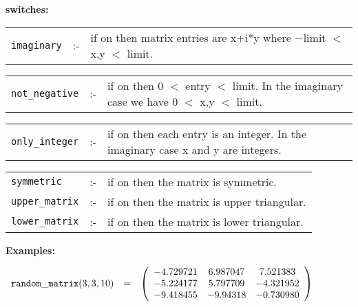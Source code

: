 {\bf switches:}

\hspace*{0.1in}
\begin{tabular}{l l l}
{\tt imaginary} \hspace*{0.175in} &:-& \parbox[t]{0.685\linewidth}{if
on then matrix entries are x+i$*$y where $-$limit $<$ x,y $<$ limit.}
\end{tabular}

\vspace*{0.04in}
\hspace*{0.1in}
\begin{tabular}{l l l}
{\tt not\_negative} &:-& \parbox[t]{0.685\linewidth}{if on then 0 $<$
entry $<$ limit. In the imaginary case we have 0 $<$ x,y $<$ limit.}
\end{tabular}

\vspace*{0.04in}
\hspace*{0.1in}
\begin{tabular}{l l l}
{\tt only\_integer} &:-& \parbox[t]{0.685\linewidth}{if on then each
entry is an integer. In the imaginary case x and y are integers.}
\end{tabular}

\vspace*{0.04in}
\hspace*{0.1in}
\begin{tabular}{l l l}
{\tt symmetric} &:-& if on then the matrix is symmetric. \\
{\tt upper\_matrix} &:-& \parbox[t]{0.685\linewidth}{if on then the
matrix is upper triangular.} \\
{\tt lower\_matrix} &:-& if on then the matrix is lower triangular.
\end{tabular}

{\bf Examples:}

\begin{flushleft}
\hspace*{0.1in}
\begin{math}
\begin{array}{ccc}
{\tt random\_matrix}(3,3,10) & = &
        \left( \begin{array}{ccc} -4.729721 & 6.987047 & 7.521383 \\
- 5.224177 & 5.797709 & - 4.321952 \\
- 9.418455 & - 9.94318 & - 0.730980
 \end{array} \right)
\end{array}
\end{math}
\end{flushleft}

